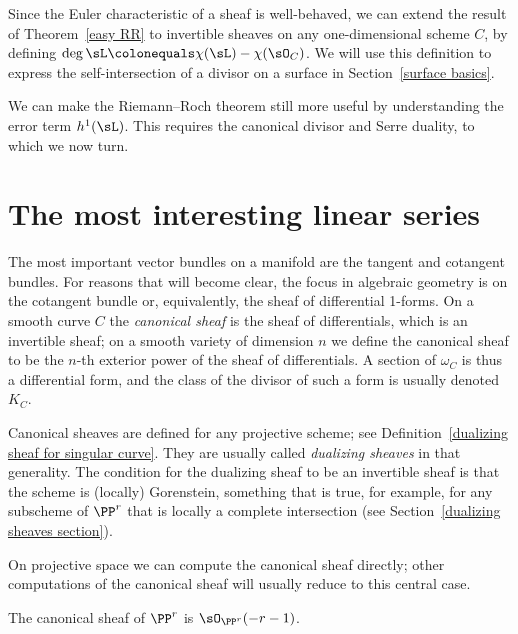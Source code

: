 Since the Euler characteristic of a sheaf is well-behaved, we can extend the result of Theorem~\ref{easy RR} 
to invertible sheaves on any one-dimensional scheme $C$, by defining
$\deg \sL \colonequals \chi(\sL) -\chi(\sO_C)$.
We will use this definition to express the self-intersection of a divisor on a surface in Section~\ref{surface basics}.

We can make the Riemann--Roch theorem still more useful by understanding the error term $h^1(\sL)$. This requires
the canonical divisor and Serre duality, to which
we now turn.


\section{The most interesting linear series}\label{most interesting}

The most important vector bundles on a manifold are the tangent and cotangent bundles. For reasons that
%
will become clear, the focus in algebraic geometry is on the cotangent
bundle or, equivalently, the sheaf of differential 1-forms. On a
smooth curve $C$ the \emph{canonical sheaf} is the sheaf of
differentials, which is an 
%
invertible sheaf; on a smooth
variety of dimension $n$ we define the canonical sheaf to be the 
$n$-th exterior power of the sheaf of differentials. A section of 
$\omega_C$ is thus a differential form, and the class of the divisor
of such a form is usually denoted 
$K_C$.
%

\begin{fact}
Canonical sheaves are defined for any projective scheme; see 
Definition~\ref{dualizing sheaf for singular curve}.
They are usually called 
%
{\it dualizing sheaves} 
in that generality. The condition for the dualizing sheaf to be an invertible
%
sheaf is that the scheme is (locally) Gorenstein, something that is true, for example, for any subscheme of $\PP^r$
that is locally a complete intersection (see Section~\ref{dualizing sheaves section}).
\end{fact}
 

On projective space we can compute the canonical sheaf directly; other computations of the canonical sheaf will usually reduce to this central case.

\begin{theorem}
 The 
canonical sheaf of $\PP^{r}$
%
is $\sO_{\PP^{r}}(-r-1)$. 
\vspace*{-\parskip}
\end{theorem}

